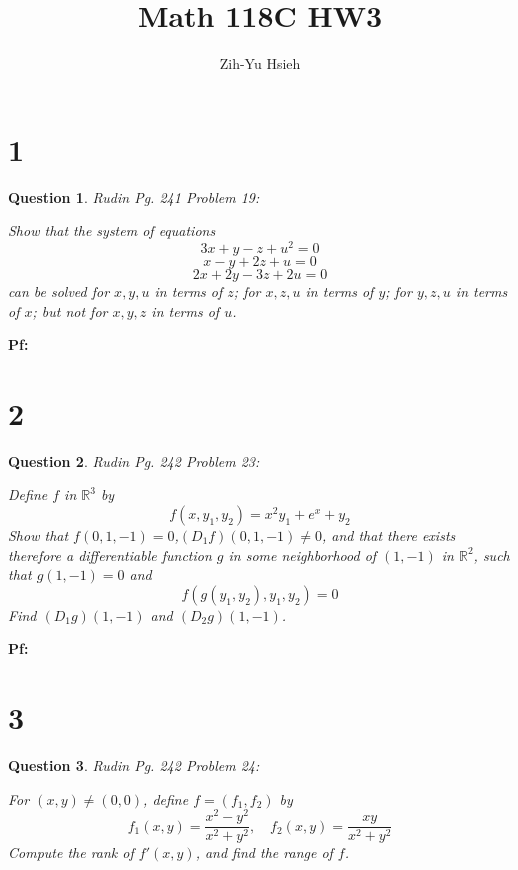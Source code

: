 \documentclass{article}
\title{Math 118C HW3}
\author{Zih-Yu Hsieh}
\newtheorem{question}{Question}
\begin{document}
\maketitle

\section*{1}
\begin{myBox}[]{}
    \begin{question}
        Rudin Pg. 241 Problem 19:

        Show that the system of equations
        $$3x+y-z+u^2=0$$
        $$x-y+2z+u=0$$
        $$2x+2y-3z+2u=0$$
        can be solved for $x,y,u$ in terms of $z$; for $x,z,u$ in terms of $y$; for $y,z,u$ in terms of $x$; but not for $x,y,z$ in terms of $u$.
    \end{question}
\end{myBox}

\textbf{Pf:}

\break

\section*{2}
\begin{myBox}[]{}
    \begin{question}
        Rudin Pg. 242 Problem 23:

        Define $f$ in $\mathbb{R}^3$ by
        $$f(x,y_1,y_2)=x^2y_1+e^x+y_2$$
        Show that $f(0,1,-1)=0$,$(D_1f)(0,1,-1)\neq 0$, and that there exists therefore a differentiable function $g$ in some neighborhood of $(1,-1)$ in $\mathbb{R}^2$,
        such that $g(1,-1)=0$ and 
        $$f(g(y_1,y_2),y_1,y_2)=0$$
        Find $(D_1g)(1,-1)$ and $(D_2g)(1,-1)$.
    \end{question}
\end{myBox}

\textbf{Pf:}

\break

\section*{3}
\begin{myBox}[]{}
    \begin{question}
        Rudin Pg. 242 Problem 24:

        For $(x,y)\neq (0,0)$, define $f=(f_1,f_2)$ by 
        $$f_1(x,y)=\frac{x^2-y^2}{x^2+y^2},\quad f_2(x,y)=\frac{xy}{x^2+y^2}$$
        Compute the rank of $f'(x,y)$, and find the range of $f$.
    \end{question}
\end{myBox}
\end{document}
